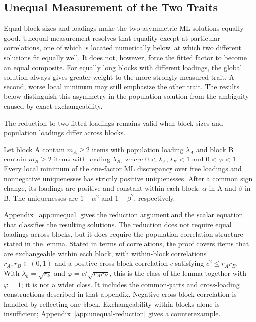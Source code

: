 \subsection{Unequal Measurement of the Two Traits}
\label{sec:unequal}

Equal block sizes and loadings make the two asymmetric ML solutions equally good. Unequal measurement resolves that equality except at particular correlations, one of which is located numerically below, at which two different solutions fit equally well. It does not, however, force the fitted factor to become an equal composite. For equally long blocks with different loadings, the global solution always gives greater weight to the more strongly measured trait. A second, worse local minimum may still emphasize the other trait. The results below distinguish this asymmetry in the population solution from the ambiguity caused by exact exchangeability.

The reduction to two fitted loadings remains valid when block sizes and population loadings differ across blocks.

\begin{lemma}
\label{lem:uniformity}
Let block A contain $m_A\ge2$ items with population loading $\lambda_A$ and block B contain $m_B\ge2$ items with loading $\lambda_B$, where $0<\lambda_A,\lambda_B<1$ and $0<\varphi<1$. Every local minimum of the one-factor ML discrepancy over free loadings and nonnegative uniquenesses has strictly positive uniquenesses. After a common sign change, its loadings are positive and constant within each block: $\alpha$ in A and $\beta$ in B. The uniquenesses are $1-\alpha^2$ and $1-\beta^2$, respectively.

\end{lemma}

Appendix~\ref{app:unequal} gives the reduction argument and the scalar equation that classifies the resulting solutions. The reduction does not require equal loadings across blocks, but it does require the population correlation structure stated in the lemma. Stated in terms of correlations, the proof covers items that are exchangeable within each block, with within-block correlations $r_A,r_B\in(0,1)$ and a positive cross-block correlation $c$ satisfying $c^2\le r_Ar_B$. With $\lambda_k=\sqrt{r_k}$ and $\varphi=c/\sqrt{r_Ar_B}$, this is the class of the lemma together with $\varphi=1$; it is not a wider class. It includes the common-parts and cross-loading constructions described in that appendix. Negative cross-block correlation is handled by reflecting one block. Exchangeability within blocks alone is insufficient; Appendix~\ref{app:unequal-reduction} gives a counterexample.

